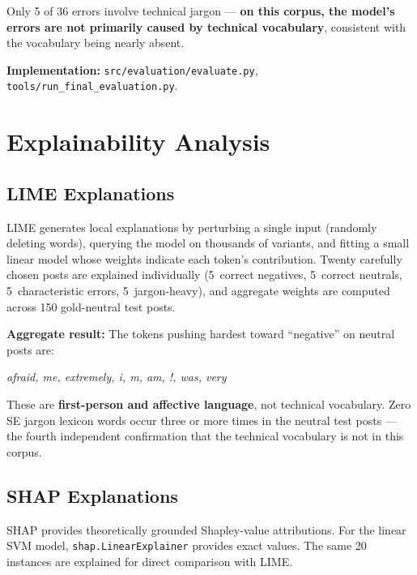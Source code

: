 \documentclass[11pt,a4paper]{article}
\begin{document}
Only 5 of 36 errors involve technical jargon --- \textbf{on this corpus, the model's errors are not primarily caused by technical vocabulary}, consistent with the vocabulary being nearly absent.

\textbf{Implementation:} \texttt{src/evaluation/evaluate.py}, \texttt{tools/run\_final\_evaluation.py}.

\section{Explainability Analysis}
\label{sec:explainability}

\subsection{LIME Explanations}

LIME generates local explanations by perturbing a single input (randomly deleting words), querying the model on thousands of variants, and fitting a small linear model whose weights indicate each token's contribution. Twenty carefully chosen posts are explained individually (5~correct negatives, 5~correct neutrals, 5~characteristic errors, 5~jargon-heavy), and aggregate weights are computed across 150 gold-neutral test posts.

\textbf{Aggregate result:} The tokens pushing hardest toward ``negative'' on neutral posts are:

\begin{center}
\textit{afraid, me, extremely, i, m, am, !, was, very}
\end{center}

These are \textbf{first-person and affective language}, not technical vocabulary. Zero SE jargon lexicon words occur three or more times in the neutral test posts --- the fourth independent confirmation that the technical vocabulary is not in this corpus.

\subsection{SHAP Explanations}

SHAP provides theoretically grounded Shapley-value attributions. For the linear SVM model, \texttt{shap.LinearExplainer} provides exact values. The same 20 instances are explained for direct comparison with LIME.
\end{document}
